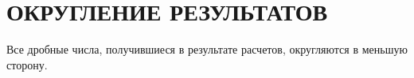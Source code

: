 \section{ОКРУГЛЕНИЕ РЕЗУЛЬТАТОВ}
Все дробные числа, получившиеся в результате расчетов, округляются в меньшую сторону.